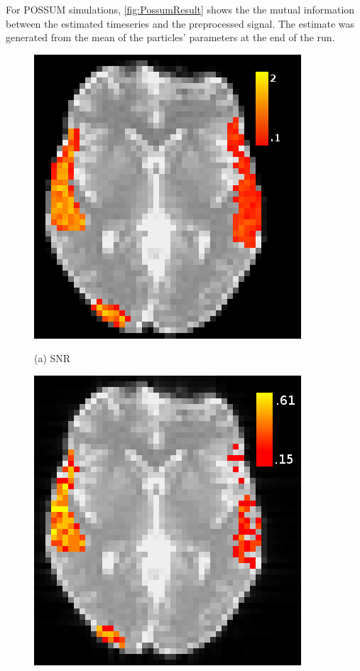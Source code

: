 \documentclass{article}
\begin{document}
For POSSUM simulations, \autoref{fig:PossumResult} shows the
the mutual information between the estimated timeseries and the 
preprocessed signal. The estimate was generated from the 
mean of the particles' parameters at the end of the run. 

\begin{figure}[htb]
\begin{minipage}[b]{.5\linewidth}
  \centering
  \centerline{\includegraphics[width=\textwidth]{snr_hm.png}}
  \centerline{(a) SNR}\medskip
\end{minipage}
\hfill
\begin{minipage}[b]{.49\linewidth}
  \centering
  \centerline{\includegraphics[width=\textwidth]{sim_hm_mi.png}}

\end{minipage}
\end{figure}
\end{document}
